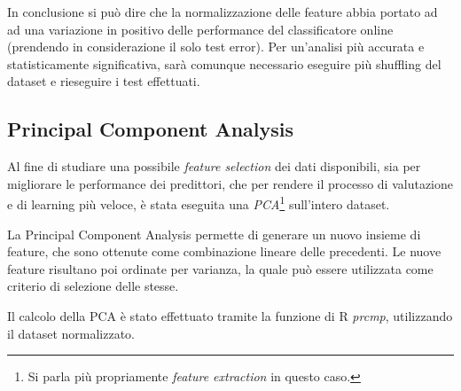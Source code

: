 \documentclass[fleqn,10pt]{SelfArx} %
\begin{document}
In conclusione si può dire che la normalizzazione delle feature abbia portato ad ad una variazione in positivo delle performance del classificatore online (prendendo in considerazione il solo test error).  Per un'analisi più accurata e statisticamente significativa, sarà comunque necessario eseguire più shuffling del dataset e rieseguire i test effettuati.

\subsection{Principal Component Analysis}
Al fine di studiare una possibile \emph{feature selection} dei dati disponibili, sia per migliorare le performance dei predittori, che per rendere il processo di valutazione e di learning più veloce, è stata eseguita una \emph{PCA}\cite{cesa:pca}\footnote{\footnotesize{Si parla più propriamente \emph{feature extraction} in questo caso.}} sull'intero dataset.
\newline

La Principal Component Analysis permette di generare un nuovo insieme di feature, che sono ottenute come combinazione lineare delle precedenti. Le nuove feature risultano poi ordinate per varianza, la quale può essere utilizzata come criterio di selezione delle stesse.
\newline

Il calcolo della PCA è stato effettuato tramite la funzione di R \emph{prcmp}, utilizzando il dataset normalizzato.
\newline
\end{document}
